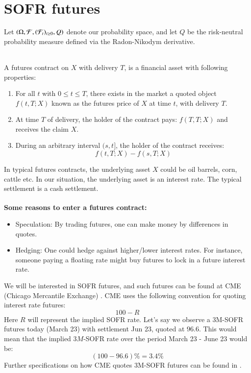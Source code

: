 \section{SOFR futures}
Let $(\Omega, \mathcal{F}, (\mathcal{F}_{t})_{t\geq 0}, Q)$ denote our probability space, and let $Q$ be the risk-neutral probability measure defined via the Radon-Nikodym derivative.
\\~\\
\begin{definition}
A futures contract on $X$ with delivery $T$, is a financial asset with following properties: 
\begin{enumerate}[leftmargin =*]
    \item For all $t$ with $0\leq t \leq T$, there exists in the market a quoted object $f(t,T;X)$ known as the futures price of $X$ at time $t$, with delivery $T$. 
    \item At time $T$ of delivery, the holder of the contract pays: $f(T,T;X)$ and receives the claim $X$.
    \item During an arbitrary interval $(s,t]$, the holder of the contract receives: 
    \[
    f(t,T;X) - f(s,T;X)
    \]
\end{enumerate}
\end{definition}

In typical futures contracts, the underlying asset  
$X$ could be oil barrels, corn, cattle etc. In our situation, the underlying asset is an interest rate. The typical settlement is a cash settlement. 
\\~\\ 
\textbf{Some reasons to enter a futures contract:}
\begin{itemize}
    \item Speculation: By trading futures, one can make money by differences in quotes.  
    \item Hedging: One could hedge against higher/lower interest rates. For instance, someone paying a floating rate might buy futures to lock in a future interest rate. 
\end{itemize}



We will be interested in SOFR futures, and such futures can be found at CME (Chicago Mercantile Exchange) . CME uses the following convention for quoting interest rate futures: 
\[
100 - R
\]
Here $R$ will represent the implied SOFR rate. Let's say we observe a 3M-SOFR futures today (March 23) with settlement Jun 23, quoted at $96.6$. This would mean that the implied $3M$-SOFR rate over the period March 23 - June 23 would be: 
\[
(100-96.6)\% = 3.4\% 
\] 
Further specifications on how CME quotes 3M-SOFR futures can be found in  \cite{cmegroup-sofr-futures}. 

